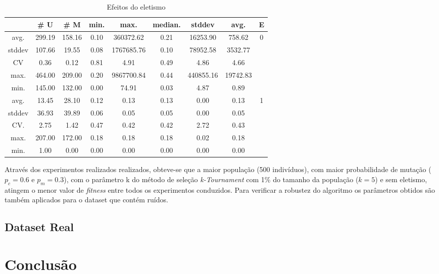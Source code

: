 \documentclass[a4paper]{paper}
\begin{document}
\begin{table}
  \center
  \caption{Efeitos do eletismo}
  \label{tbl:var_eletism}
  \begin{tabular}{| c | c | c | c | c | c | c | c | c |}
    \hline
    &  \# U & \# M & min. & max. & median. & stddev & avg. & E \\ \hline \hline
avg. & 299.19 & 158.16 & 0.10 & 360372.62 & 0.21 & 16253.90 & 758.62 & \multirow{5}{1.5cm}{0} \\ \cline{1-8}
stddev & 107.66 & 19.55 & 0.08 & 1767685.76 & 0.10 & 78952.58 & 3532.77 & \\ \cline{1-8}
CV & 0.36 & 0.12 & 0.81 & 4.91 & 0.49 & 4.86 & 4.66 & \\ \cline{1-8}
max. & 464.00 & 209.00 & 0.20 & 9867700.84 & 0.44 & 440855.16 & 19742.83 & \\ \cline{1-8}
min. & 145.00 & 132.00 & 0.00 & 74.91 & 0.03 & 4.87 & 0.89 & \\ \hline \hline
avg. & 13.45 & 28.10 & 0.12 & 0.13 & 0.13 & 0.00 & 0.13 & \multirow{5}{1.5cm}{1} \\ \cline{1-8}
stddev & 36.93 & 39.89 & 0.06 & 0.05 & 0.05 & 0.00 & 0.05 & \\ \cline{1-8}
CV. & 2.75 & 1.42 & 0.47 & 0.42 & 0.42 & 2.72 & 0.43 & \\ \cline{1-8}
max. & 207.00 & 172.00 & 0.18 & 0.18 & 0.18 & 0.02 & 0.18 & \\ \cline{1-8}
min. & 1.00 & 0.00 & 0.00 & 0.00 & 0.00 & 0.00 & 0.00 & \\ \hline \hline
  \end{tabular}
\end{table}

Através dos experimentos realizados realizados, obteve-se que a maior população
(500 indivíduos), com maior probabilidade de mutação ($p_c=0.6$ e $p_m=0.3$),
com o parâmetro k do método de seleção \textit{k-Tournament} com 1\% do tamanho
da população ($k=5$) e sem eletismo, atingem o menor valor de \textit{fitness}
entre todos os experimentos conduzidos. Para verificar a robustez do algoritmo
os parâmetros obtidos são também aplicados para o dataset que contém ruídos.



\subsection{Dataset Real}

\section{Conclusão}


\citet*{poli2008}


\end{document}
